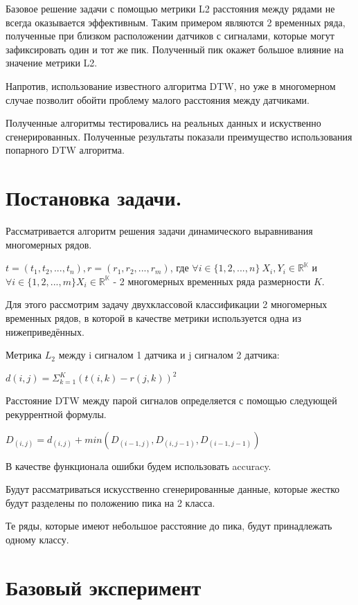 \documentclass[12pt, twoside]{article}
\begin{document}
Базовое решение задачи с помощью метрики L2 расстояния между рядами не всегда оказывается эффективным. Таким примером являются 2 временных ряда, полученные при близком расположении датчиков с сигналами, которые могут зафиксировать один и тот же пик. Полученный пик окажет большое влияние на значение метрики L2.

Напротив, использование известного алгоритма DTW, но уже в многомерном случае позволит обойти проблему малого расстояния между датчиками.

Полученные алгоритмы тестировались на реальных данных и искуственно  сгенерированных. Полученные результаты показали преимущество использования попарного DTW алгоритма.


\section{Постановка задачи.}

Рассматривается алгоритм решения задачи динамического выравнивания многомерных рядов.

$t = (t_1, t_2, ..., t_n), r = (r_1, r_2, ..., r_m)$, где $\forall i \in \{1, 2, ..., n\}\  X_i, Y_i \in \mathbb{R^K}$ и $\forall i  \in \{1, 2, ..., m\}  X_i \in \mathbb{R^K}$ - 2 многомерных временных ряда размерности $K$.

Для этого рассмотрим задачу двухклассовой классификации 2 многомерных временных рядов, в которой в качестве метрики используется одна из нижеприведённых.

Метрика $L_2$ между i сигналом 1 датчика и j сигналом 2 датчика: 

$d(i, j) = \Sigma_{k = 1}^K(t(i, k) - r(j, k))^2$

Расстояние DTW между парой сигналов определяется с помощью следующей рекуррентной формулы.

$D_{(i, j)} = d_{(i, j)} + min(D_{(i - 1, j)}, D_{(i, j - 1)}, D_{(i - 1, j - 1)})$

В качестве функционала ошибки будем использовать accuracy.

Будут рассматриваться искусственно сгенерированные данные, которые жестко будут разделены по положению пика на 2 класса.

Те ряды, которые имеют небольшое расстояние до пика, будут принадлежать одному классу.


\section{Базовый эксперимент}
\end{document}
